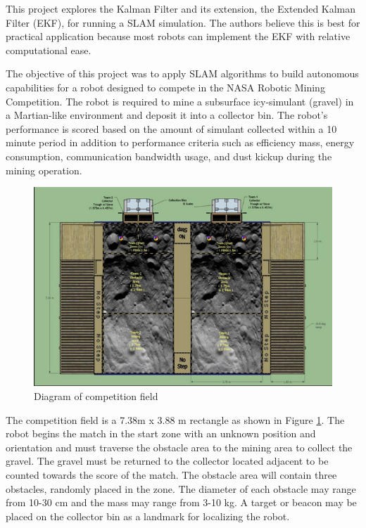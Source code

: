 \documentclass[journal]{IEEEtran}
\begin{document}
This project explores the Kalman Filter and its extension, the Extended Kalman Filter (EKF), 
for running a SLAM simulation. The authors believe this is best for practical application 
because most robots can implement the EKF with relative computational ease. 

The objective of this project was to apply SLAM algorithms to build autonomous capabilities 
for a robot designed to compete in the NASA Robotic Mining Competition. The robot is 
required to mine a subsurface icy-simulant (gravel) in a Martian-like environment and deposit 
it into a collector bin. The robot’s performance is scored based on the amount of simulant 
collected within a 10 minute period in addition to performance criteria such as efficiency 
mass, energy consumption, communication bandwidth usage, and dust kickup during the mining 
operation.

\begin{figure}[!t]%
\centering
\includegraphics[width=0.9\linewidth]{Figures/playing-field.jpg}
\caption{Diagram of competition field \cite{nasa-rmc-rules}}
\label{fig:playing-field}
\end{figure}

The competition field is a 7.38m x 3.88 m rectangle as shown in Figure \ref{fig:playing-field}. 
The robot begins the match in the start zone with an unknown position and orientation and must 
traverse the obstacle area to the mining area to collect the gravel. The gravel must be 
returned to the collector located adjacent to be counted towards the score of the match. The 
obstacle area will contain three obstacles, randomly placed in the zone. The diameter of each 
obstacle may range from 10-30 cm and the mass may range from 3-10 kg. A target or beacon may 
be placed on the collector bin as a landmark for localizing the robot. 
\end{document}
